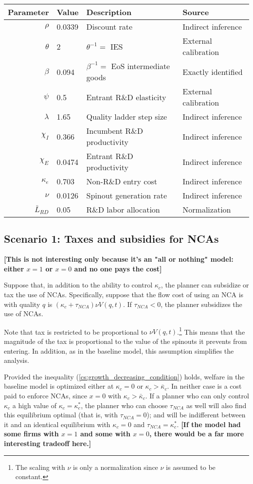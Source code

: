 \documentclass[11pt,english]{article}
\theoremstyle{remark}
\begin{document}
\begin{table}[]
	\centering
	\label{calibration_lowEntry_parameters}
	\begin{tabular}{rlll}
		\toprule \toprule
		Parameter & Value & Description & Source \tabularnewline
		\midrule
		$\rho$ & 0.0339 & Discount rate  & Indirect inference \tabularnewline
		$\theta$ & 2 & $\theta^{-1} = $ IES & External calibration 
		\tabularnewline
		$\beta$ & 0.094 & $\beta^{-1} = $ EoS intermediate goods & Exactly identified \tabularnewline 
		$\psi$ & 0.5 & Entrant R\&D elasticity & External calibration \tabularnewline
		$\lambda$ & 1.65 & Quality ladder step size & Indirect inference 
		\tabularnewline
		$\chi_I$ & 0.366 & Incumbent R\&D productivity & Indirect inference 
		\tabularnewline
		$\chi_E$ & 0.0474 & Entrant R\&D productivity & Indirect inference \tabularnewline 
		$\kappa_e$ & 0.703 & Non-R\&D entry cost & Indirect inference \tabularnewline
		$\nu$ & 0.0126 & Spinout generation rate  & Indirect inference\tabularnewline
		$\bar{L}_{RD}$ & 0.05 & R\&D labor allocation  & Normalization \tabularnewline
		\bottomrule
	\end{tabular}
\end{table}

\subsection{Scenario 1: Taxes and subsidies for NCAs}

\textbf{[This is not interesting only because it's an "all or nothing" model: either $x = 1$ or $x = 0$ and no one pays the cost]}

Suppose that, in addition to the ability to control $\kappa_c$, the planner can subsidize or tax the use of NCAs. Specifically, suppose that the flow cost of using an NCA is with quality $q$ is $(\kappa_c + \tau_{NCA})\nu  V(q,t)$. If $\tau_{NCA} < 0$, the planner subsidizes the use of NCAs.

Note that tax is restricted to be proportional to $\nu V(q,t)$.\footnote{The scaling with $\nu$ is only a normalization since $\nu$ is assumed to be constant.} This means that the magnitude of the tax is proportional to the value of the spinouts it prevents from entering. In addition, as in the baseline model, this assumption simplifies the analysis.

Provided the inequality (\ref{cs:growth_decreasing_condition}) holds, welfare in the baseline model is optimized either at $\kappa_c = 0$ or $\kappa_c > \bar{\kappa}_c$. In neither case is a cost paid to enforce NCAs, since $x = 0$ with $\kappa_c > \bar{\kappa}_c$. If a planner who can only control $\kappa_c$ a high value of $\kappa_c = \kappa_c^*$, the planner who can choose $\tau_{NCA}$ as well will also find this equilibrium optimal (that is, with $\tau_{NCA} = 0$); and will be indifferent between it and an identical equilibrium with $\kappa_c = 0$ and $\tau_{NCA} = \kappa_c^*$. \textbf{[If the model had some firms with $x = 1$ and some with $x = 0$, there would be a far more interesting tradeoff here.]} 
\end{document}
